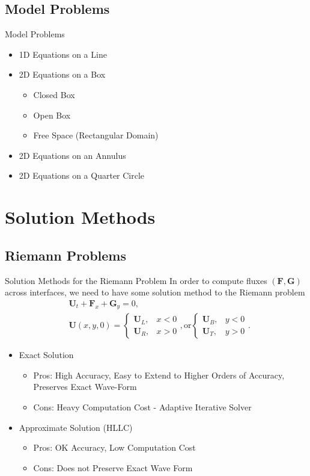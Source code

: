 \documentclass{beamer}
\newcommand{\mbf}{\mathbf}
\newcommand{\bq}{\begin{equation}}
\newcommand{\eq}{\end{equation}}
\begin{document}
\subsection{Model Problems}
\begin{frame}{Model Problems}
\begin{itemize}
\item 1D Equations on a Line

\item 2D Equations on a Box
\begin{itemize}
\item Closed Box

\item Open Box

\item Free Space (Rectangular Domain)
\end{itemize}
\item 2D Equations on an Annulus 
\item 2D Equations on a Quarter Circle
\end{itemize}
\end{frame}
\section{Solution Methods}
\subsection{Riemann Problems}
\begin{frame}{Solution Methods for the Riemann Problem}
In order to compute fluxes $(\mbf{F}, \mbf{G})$ across interfaces, we need to have some solution method to the Riemann problem
\bq \begin{split}
&\mbf{U}_t+\mbf{F}_x+\mbf{G}_y=0,\\
&\mbf{U}(x,y,0)=\left\{\begin{array}{cc}\mbf{U}_L,&x<0\\ \mbf{U}_R,&x>0\end{array}\right., \text{or} \left\{\begin{array}{cc}\mbf{U}_B,&y<0\\ \mbf{U}_T,&y>0\end{array}\right..
\end{split} \eq
\begin{itemize}
\item Exact Solution
\begin{itemize}
\item Pros: High Accuracy, Easy to Extend to Higher Orders of Accuracy, Preserves Exact Wave-Form
\item Cons: Heavy Computation Cost - Adaptive Iterative Solver
\end{itemize}
\item Approximate Solution (HLLC)
\begin{itemize}
\item Pros: OK Accuracy, Low Computation Cost
\item Cons: Does not Preserve Exact Wave Form
\end{itemize}
\end{itemize}
\end{frame}
\end{document}
